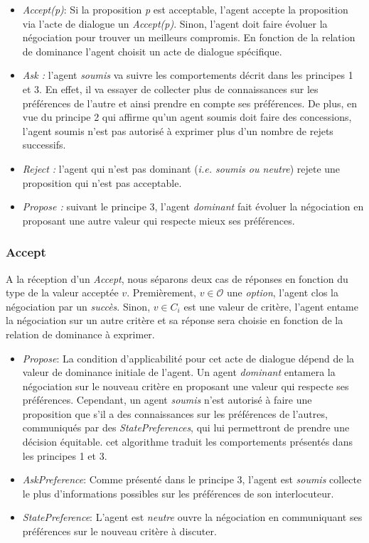 	\begin{itemize}
		
		\item  \emph{Accept(p)}: Si la proposition \emph{p} est acceptable, l'agent accepte la proposition via l'acte de dialogue un \emph{Accept(p)}. Sinon, l'agent doit faire évoluer la négociation pour trouver un meilleurs compromis. En fonction de la relation de dominance l'agent choisit un acte de dialogue spécifique.
		\item \emph{Ask :} l'agent \emph{soumis} va suivre les comportements décrit dans les principes 1 et 3. En effet, il va essayer de collecter plus de connaissances sur les préférences de l'autre et ainsi prendre en compte ses préférences. De plus, en vue du principe 2 qui affirme qu'un agent soumis doit faire des concessions, l'agent soumis n'est pas autorisé à exprimer plus d'un nombre de rejets successifs.  
		\item \emph{Reject :} l'agent qui n'est pas dominant (\emph{i.e. soumis ou neutre}) rejete une proposition qui n'est pas acceptable.
		\item \emph{Propose :} suivant le principe 3, l'agent \emph{dominant} fait évoluer la négociation en proposant une autre valeur qui respecte mieux ses préférences. 
	\end{itemize}
	
	\subsubsection{Accept }
	A la réception	d'un \emph{Accept}, nous séparons deux cas de réponses en fonction du type de la valeur acceptée $v$.
	Premièrement, $ v \in \mathcal{O}$ une \textit{option}, l'agent clos la négociation par un \emph{succès}.
	Sinon, $v \in C_i$ est une valeur de critère, l'agent entame la négociation sur un autre critère et sa réponse sera choisie en fonction de la relation de dominance à exprimer.
	
	\begin{itemize}
		\item \emph{Propose}: La condition d'applicabilité pour cet acte de dialogue dépend de la valeur de dominance initiale de l'agent. Un agent \emph{dominant} entamera la négociation sur le nouveau critère en proposant une valeur qui respecte ses préférences. Cependant, un agent \emph{soumis} n'est autorisé à faire une proposition que s'il a des connaissances sur les préférences de l'autres,  communiqués par des \emph{StatePreferences}, qui lui permettront de prendre une décision équitable. cet algorithme traduit les comportements présentés dans les principes 1 et 3. 
		
		\item \emph{AskPreference}: Comme présenté dans le principe 3, l'agent est \emph{soumis} collecte le plus d'informations possibles sur les préférences de son interlocuteur. 
		\item \emph{StatePreference}: L'agent est \emph{neutre} ouvre la négociation en communiquant ses préférences sur le nouveau critère à discuter. 
		
	\end{itemize}
	
